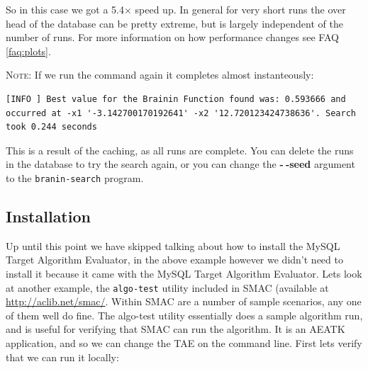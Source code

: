 \documentclass[11pt,letterpaper,oneside]{article}
\begin{document}
So in this case we got a 5.4$\times$ speed up. In general for very short runs the over head of the database can be pretty extreme, but is largely independent of the number of runs. For more information on how performance changes see FAQ \ref{faq:plots}.

\textsc{Note}: If we run the command again it completes almost instanteously:

\begin{verbatim}
[INFO ] Best value for the Brainin Function found was: 0.593666 and occurred at -x1 '-3.142700170192641' -x2 '12.720123424738636'. Search took 0.244 seconds
\end{verbatim}

This is a result of the caching, as all runs are complete. You can delete the runs in the database to try the search again, or you can change the \textbf{-$~\!$-seed} argument to the \texttt{branin-search} program.






\subsection{Installation}

Up until this point we have skipped talking about how to install the MySQL Target Algorithm Evaluator, in the above example however we didn't need to install it because it came with the MySQL Target Algorithm Evaluator.  Lets look at another example, the \texttt{algo-test} utility included in SMAC (available at \url{http://aclib.net/smac/}. Within SMAC are a number of sample scenarios, any one of them well do fine. The algo-test utility essentially does a sample algorithm run, and is useful for verifying that SMAC can run the algorithm. It is an AEATK application, and so we can change the TAE on the command line.  First lets verify that we can run it locally:
\end{document}
